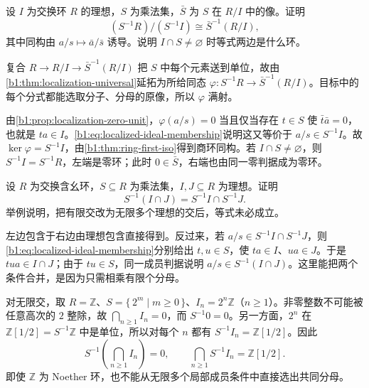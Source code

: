 \begin{exercise}\label{b1:ex:13-7}
	设 \(I\) 为交换环 \(R\) 的理想，\(S\) 为乘法集，\(\bar S\) 为 \(S\) 在 \(R/I\) 中的像。证明
	\[
		(S^{-1}R)/(S^{-1}I)\cong\bar S^{-1}(R/I),
	\]
	其中同构由 \(a/s\mapsto\bar a/\bar s\) 诱导。说明 \(I\cap S\neq\varnothing\) 时等式两边是什么环。
\end{exercise}
\begin{solution}
	复合 \(R\rightarrow R/I\rightarrow\bar S^{-1}(R/I)\) 把 \(S\) 中每个元素送到单位，故由\cref{b1:thm:localization-universal}延拓为所给同态 \(\varphi:S^{-1}R\rightarrow\bar S^{-1}(R/I)\)。目标中的每个分式都能选取分子、分母的原像，所以 \(\varphi\) 满射。

	由\cref{b1:prop:localization-zero-unit}，\(\varphi(a/s)=0\) 当且仅当存在 \(t\in S\) 使 \(\bar t\bar a=0\)，也就是 \(ta\in I\)。\eqref{b1:eq:localized-ideal-membership}说明这又等价于 \(a/s\in S^{-1}I\)。故 \(\ker\varphi=S^{-1}I\)，由\cref{b1:thm:ring-first-iso}得到商环同构。若 \(I\cap S\neq\varnothing\)，则 \(S^{-1}I=S^{-1}R\)，左端是零环；此时 \(0\in\bar S\)，右端也由同一零判据成为零环。
\end{solution}

\begin{exercise}\label{b1:ex:13-localized-finite-intersection}
	设 \(R\) 为交换含幺环，\(S\subseteq R\) 为乘法集，\(I,J\subseteq R\) 为理想。证明
	\[
		S^{-1}(I\cap J)=S^{-1}I\cap S^{-1}J.
	\]
	举例说明，把有限交改为无限多个理想的交后，等式未必成立。
\end{exercise}
\begin{solution}
	左边包含于右边由理想包含直接得到。反过来，若 \(a/s\in S^{-1}I\cap S^{-1}J\)，则\eqref{b1:eq:localized-ideal-membership}分别给出 \(t,u\in S\)，使 \(ta\in I\)、\(ua\in J\)。于是 \(tua\in I\cap J\)；由于 \(tu\in S\)，同一成员判据说明 \(a/s\in S^{-1}(I\cap J)\)。这里能把两个条件合并，是因为只需相乘有限个分母。

	对无限交，取 \(R=\mathbb Z\)、\(S=\{\,2^m\mid m\geq0\,\}\)、\(I_n=2^n\mathbb Z\)（\(n\geq1\)）。非零整数不可能被任意高次的 \(2\) 整除，故 \(\bigcap_{n\geq1}I_n=0\)，而 \(S^{-1}0=0\)。另一方面，\(2^n\) 在 \(\mathbb Z[1/2]=S^{-1}\mathbb Z\) 中是单位，所以对每个 \(n\) 都有 \(S^{-1}I_n=\mathbb Z[1/2]\)。因此
	\[
		S^{-1}\!\left(\bigcap_{n\geq1}I_n\right)=0, \qquad \bigcap_{n\geq1}S^{-1}I_n=\mathbb Z[1/2].
	\]
	即使 \(\mathbb Z\) 为 Noether 环，也不能从无限多个局部成员条件中直接选出共同分母。
\end{solution}

